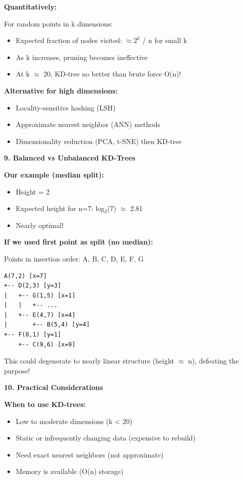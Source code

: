 \documentclass[12pt]{article}
\begin{document}
\begin{explanation}
\textbf{Quantitatively:}

For random points in k dimensions:
\begin{itemize}
    \item Expected fraction of nodes visited: $\approx 2^{k}$ / n for small k
    \item As k increases, pruning becomes ineffective
    \item At k $\approx$ 20, KD-tree no better than brute force O(n)!
\end{itemize}

\textbf{Alternative for high dimensions:}
\begin{itemize}
    \item Locality-sensitive hashing (LSH)
    \item Approximate nearest neighbor (ANN) methods
    \item Dimensionality reduction (PCA, t-SNE) then KD-tree
\end{itemize}

\textbf{9. Balanced vs Unbalanced KD-Trees}

\textbf{Our example (median split):}
\begin{itemize}
    \item Height = 2
    \item Expected height for n=7: log$_2$(7) $\approx$ 2.81
    \item Nearly optimal!
\end{itemize}

\textbf{If we used first point as split (no median):}

Points in insertion order: A, B, C, D, E, F, G

\begin{verbatim}
A(7,2) [x=7]
+-- D(2,3) [y=3]
|   +-- G(1,5) [x=1]
|   |   +-- ...
|   +-- E(4,7) [x=4]
|       +-- B(5,4) [y=4]
+-- F(8,1) [y=1]
    +-- C(9,6) [x=9]
\end{verbatim}

This could degenerate to nearly linear structure (height $\approx$ n), defeating the purpose!

\textbf{10. Practical Considerations}

\textbf{When to use KD-trees:}
\begin{itemize}
    \item Low to moderate dimensions (k < 20)
    \item Static or infrequently changing data (expensive to rebuild)
    \item Need exact nearest neighbors (not approximate)
    \item Memory is available (O(n) storage)
\end{itemize}


\end{explanation}
\end{document}
